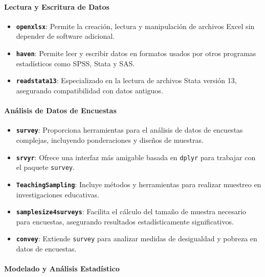 \documentclass[
  12pt,
]{book}
\providecommand{\tightlist}{%
  \setlength{\itemsep}{0pt}\setlength{\parskip}{0pt}}
\begin{document}
\hypertarget{lectura-y-escritura-de-datos}{%
\paragraph*{Lectura y Escritura de Datos}\label{lectura-y-escritura-de-datos}}

\begin{itemize}
\tightlist
\item
  \textbf{\texttt{openxlsx}}: Permite la creación, lectura y manipulación de archivos Excel sin depender de software adicional.
\item
  \textbf{\texttt{haven}}: Permite leer y escribir datos en formatos usados por otros programas estadísticos como SPSS, Stata y SAS.
\item
  \textbf{\texttt{readstata13}}: Especializado en la lectura de archivos Stata versión 13, asegurando compatibilidad con datos antiguos.
\end{itemize}

\hypertarget{anuxe1lisis-de-datos-de-encuestas}{%
\paragraph*{Análisis de Datos de Encuestas}\label{anuxe1lisis-de-datos-de-encuestas}}

\begin{itemize}
\tightlist
\item
  \textbf{\texttt{survey}}: Proporciona herramientas para el análisis de datos de encuestas complejas, incluyendo ponderaciones y diseños de muestras.
\item
  \textbf{\texttt{srvyr}}: Ofrece una interfaz más amigable basada en \texttt{dplyr} para trabajar con el paquete \texttt{survey}.
\item
  \textbf{\texttt{TeachingSampling}}: Incluye métodos y herramientas para realizar muestreo en investigaciones educativas.
\item
  \textbf{\texttt{samplesize4surveys}}: Facilita el cálculo del tamaño de muestra necesario para encuestas, asegurando resultados estadísticamente significativos.
\item
  \textbf{\texttt{convey}}: Extiende \texttt{survey} para analizar medidas de desigualdad y pobreza en datos de encuestas.
\end{itemize}

\hypertarget{modelado-y-anuxe1lisis-estaduxedstico}{%
\paragraph*{Modelado y Análisis Estadístico}\label{modelado-y-anuxe1lisis-estaduxedstico}}
\end{document}
